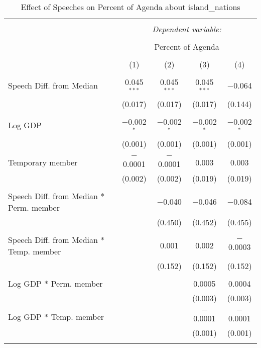 
\begin{table}[!htbp] \centering 
  \caption{Effect of Speeches on Percent of Agenda about island_nations} 
  \label{} 
\begin{tabular}{@{\extracolsep{5pt}}lcccc} 
\\[-1.8ex]\hline 
\hline \\[-1.8ex] 
 & \multicolumn{4}{c}{\textit{Dependent variable:}} \\ 
\cline{2-5} 
\\[-1.8ex] & \multicolumn{4}{c}{Percent of Agenda} \\ 
\\[-1.8ex] & (1) & (2) & (3) & (4)\\ 
\hline \\[-1.8ex] 
 Speech Diff. from Median & 0.045$^{***}$ & 0.045$^{***}$ & 0.045$^{***}$ & $-$0.064 \\ 
  & (0.017) & (0.017) & (0.017) & (0.144) \\ 
  & & & & \\ 
 Log GDP & $-$0.002$^{*}$ & $-$0.002$^{*}$ & $-$0.002$^{*}$ & $-$0.002$^{*}$ \\ 
  & (0.001) & (0.001) & (0.001) & (0.001) \\ 
  & & & & \\ 
 Temporary member & $-$0.0001 & $-$0.0001 & 0.003 & 0.003 \\ 
  & (0.002) & (0.002) & (0.019) & (0.019) \\ 
  & & & & \\ 
 Speech Diff. from Median * Perm. member &  & $-$0.040 & $-$0.046 & $-$0.084 \\ 
  &  & (0.450) & (0.452) & (0.455) \\ 
  & & & & \\ 
 Speech Diff. from Median * Temp. member &  & 0.001 & 0.002 & $-$0.0003 \\ 
  &  & (0.152) & (0.152) & (0.152) \\ 
  & & & & \\ 
 Log GDP * Perm. member &  &  & 0.0005 & 0.0004 \\ 
  &  &  & (0.003) & (0.003) \\ 
  & & & & \\ 
 Log GDP * Temp. member &  &  & $-$0.0001 & $-$0.0001 \\ 
  &  &  & (0.001) & (0.001) \\ 
  & & & & \\ 

\end{tabular}
\end{table}

